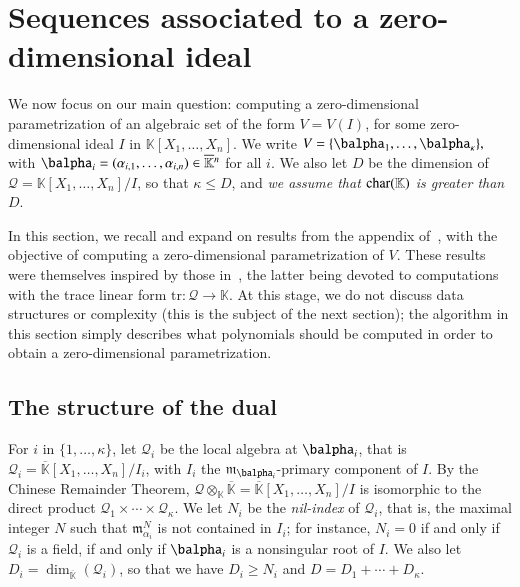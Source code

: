 \documentclass[final,1p,times,authoryear]{elsarticle}
\newcommand{\residueI}{\mathscr{Q}}
\def\dg{\kappa}
\def\K{\mathbb{K}}
\def\K {\ensuremath{\mathbb{K}}}
\def\Kbar {{\ensuremath{\overline{\mathbb{K}}}}}
\def\D {\ensuremath{D}}
\def\m {\ensuremath{\mathfrak{m}}}
\begin{document}

\section{Sequences associated to a zero-dimensional ideal}\label{sec:seq0}

We now focus on our main question: computing a zero-dimensional
parametrization of an algebraic set of the form $V=V(I)$, for some
zero-dimensional ideal $I$ in $\K[X_1,\dots,X_n]$. We write
$V=\{\balpha_1,\dots,\balpha_\dg\},$ with
$\balpha_i=(\alpha_{i,1},\dots,\alpha_{i,n}) \in \Kbar{}^n$ for all
$i$.  We also let $\D$ be the dimension of
$\residueI=\K[X_1,\dots,X_n]/I$, so that $\dg \le \D$, and {\em we
  assume that ${\rm char}(\K)$ is greater than $D$}.

In this section, we recall and expand on results from the appendix
of~\citep{BoSaSc03}, with the objective of computing a zero-dimensional
parametrization of $V$. These results were themselves inspired by 
those in~\citep{Rouillier99}, the latter being devoted to computations
with the trace linear form $\mathrm{tr}: \residueI\to\K$.
At this stage, we do not discuss data structures or complexity (this
is the subject of the next section); the algorithm in this
section simply describes what polynomials should be computed in order
to obtain a zero-dimensional parametrization.


\subsection{The structure of the dual}\label{ssec:dual}

For $i$ in $\{1,\dots,\dg\}$, let $\residueI_i$ be the local algebra at
$\balpha_i$, that is $\residueI_i=\Kbar[X_1,\dots,X_n]/I_i$, with $I_i$ the
$\m_{\balpha_i}$-primary component of $I$. By the Chinese Remainder
Theorem, $\residueI\otimes_\K \Kbar=\Kbar[X_1,\dots,X_n]/I$ is isomorphic to
the direct product $\residueI_1\times \cdots \times \residueI_\dg$.  We let $N_i$ be the
{\em nil-index} of $\residueI_i$, that is, the maximal integer $N$ such that
$\m_{\alpha_i}^N$ is not contained in $I_i$; for instance, $N_i=0$ if
and only if $\residueI_i$ is a field, if and only if $\balpha_i$ is a
nonsingular root of $I$. We also let $\D_i=\dim_\Kbar(\residueI_i)$, so that
we have $D_i \ge N_i$ and $\D=\D_1 + \cdots + \D_\dg$.
\end{document}
